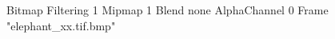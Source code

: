 {Bitmap
	{Filtering 1}
	{Mipmap 1}
	{Blend none}
	{AlphaChannel 0}
	{Frame "elephant_xx.tif.bmp"}
}

